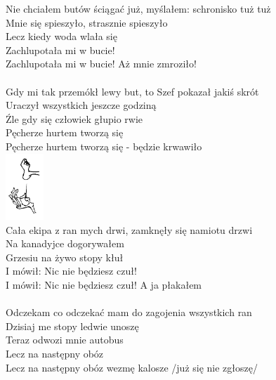 \documentclass[a5paper, 10pt]{book}
\begin{document}
\begin{minipage}[b]{0.8\textwidth}
Nie chciałem butów ściągać już, myślałem: schronisko tuż tuż\\
Mnie się spieszyło, strasznie spieszyło		\\
\hspace*{5mm}Lecz kiedy woda wlała się				\\
\hspace*{5mm}Zachlupotała mi w bucie!					\\
\hspace*{5mm}Zachlupotała mi w bucie! Aż mnie zmroziło!\\
\\
Gdy mi tak przemókł lewy but, to Szef pokazał jakiś skrót\\
Uraczył wszystkich jeszcze godziną\\
\hspace*{5mm}Źle gdy się człowiek głupio rwie\\
\hspace*{5mm}Pęcherze hurtem tworzą się\\
\hspace*{5mm}Pęcherze hurtem tworzą się - będzie krwawiło\\
\includegraphics[height=2.5cm,right]{images/stopa_dejwa.png}\vspace*{-2.6cm}\\

Cała ekipa z ran mych drwi, zamknęły się namiotu drzwi\\
Na kanadyjce dogorywałem\\
\hspace*{5mm}Grzesiu na żywo stopy kłuł\\
\hspace*{5mm}I mówił: Nic nie będziesz czuł!\\
\hspace*{5mm}I mówił: Nic nie będziesz czuł! A ja płakałem\\
\\
Odczekam co odczekać mam do zagojenia wszystkich ran\\
Dzisiaj me stopy ledwie unoszę\\
\hspace*{5mm}Teraz odwozi mnie autobus\\
\hspace*{5mm}Lecz na następny obóz\\
\hspace*{5mm}Lecz na następny obóz wezmę kalosze /już się nie zgłoszę/\\
\end{minipage}
\end{document}
